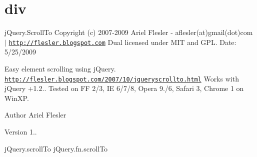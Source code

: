 \hypertarget{div-example}{}\section{div}
j\+Query.\+Scroll\+To Copyright (c) 2007-\/2009 Ariel Flesler -\/ aflesler(at)gmail(dot)com $\vert$ \href{http://flesler.blogspot.com}{\tt http\+://flesler.\+blogspot.\+com} Dual licensed under M\+IT and G\+PL. Date\+: 5/25/2009

Easy element scrolling using j\+Query. \href{http://flesler.blogspot.com/2007/10/jqueryscrollto.html}{\tt http\+://flesler.\+blogspot.\+com/2007/10/jqueryscrollto.\+html} Works with j\+Query +1.2.. Tested on FF 2/3, IE 6/7/8, Opera 9./6, Safari 3, Chrome 1 on Win\+XP.

\begin{DoxyAuthor}{Author}
Ariel Flesler 
\end{DoxyAuthor}
\begin{DoxyVersion}{Version}
1..
\end{DoxyVersion}
j\+Query.\+scroll\+To  j\+Query.\+fn.\+scroll\+To 
